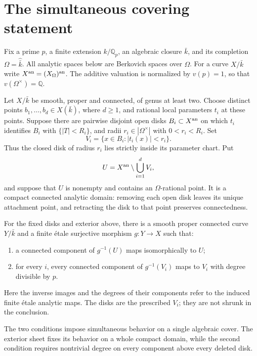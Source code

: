 \section{The simultaneous covering statement}

Fix a prime $p$, a finite extension $k/\mathbb Q_p$, an algebraic
closure $\bar k$, and its completion $\Omega=\widehat{\bar k}$.
All analytic spaces below are Berkovich spaces over $\Omega$.
For a curve $X/\bar k$ write $X^{\rm an}=(X_\Omega)^{\rm an}$.
The additive valuation is normalized by $v(p)=1$, so that
$v(\Omega^\times)=\mathbb Q$.

Let $X/\bar k$ be smooth, proper and connected, of genus at least two.
Choose distinct points $b_1,\ldots,b_d\in X(\bar k)$, where $d\ge1$,
and rational local parameters $t_i$ at these points. Suppose there
are pairwise disjoint open disks $B_i\subset X^{\rm an}$ on which
$t_i$ identifies $B_i$ with $\{|T|<R_i\}$, and radii
$r_i\in|\Omega^\times|$ with $0<r_i<R_i$. Set
\[
 V_i=\{x\in B_i:|t_i(x)|<r_i\}.
\]
Thus the closed disk of radius $r_i$ lies strictly inside its parameter
chart. Put
\[
 U=X^{\rm an}\setminus\bigcup_{i=1}^d V_i,
\]
and suppose that $U$ is nonempty and contains an $\Omega$-rational
point. It is a compact connected analytic domain: removing each open
disk leaves its unique attachment point, and retracting the disk to
that point preserves connectedness.

\begin{theorem}\label{thm:exterior}
For the fixed disks and exterior above, there is a smooth proper
connected curve $Y/\bar k$ and a finite \'etale surjective morphism
$g:Y\to X$ such that:
\begin{enumerate}[label=\textup{(\roman*)}]
\item a connected component of $g^{-1}(U)$ maps isomorphically to $U$;
\item for every $i$, every connected component of $g^{-1}(V_i)$
maps to $V_i$ with degree divisible by $p$.
\end{enumerate}
Here the inverse images and the degrees of their components refer
to the induced finite \'etale analytic maps. The disks are the prescribed
$V_i$; they are not shrunk in the conclusion.
\end{theorem}

The two conditions impose simultaneous behavior on a single algebraic
cover. The exterior sheet fixes its behavior on a whole compact domain,
while the second condition requires nontrivial degree on every component
above every deleted disk.

